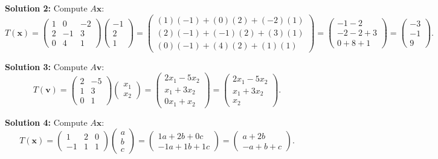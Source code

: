 \documentclass{article}
\begin{document}
\textbf{Solution 2:}
Compute $A\mathbf{x}$:
$$T(\mathbf{x}) = \begin{pmatrix} 1 & 0 & -2 \\ 2 & -1 & 3 \\ 0 & 4 & 1 \end{pmatrix} \begin{pmatrix} -1 \\ 2 \\ 1 \end{pmatrix} = \begin{pmatrix} (1)(-1) + (0)(2) + (-2)(1) \\ (2)(-1) + (-1)(2) + (3)(1) \\ (0)(-1) + (4)(2) + (1)(1) \end{pmatrix} = \begin{pmatrix} -1 - 2 \\ -2 - 2 + 3 \\ 0 + 8 + 1 \end{pmatrix} = \begin{pmatrix} -3 \\ -1 \\ 9 \end{pmatrix}.$$

\textbf{Solution 3:}
Compute $A\mathbf{v}$:
$$T(\mathbf{v}) = \begin{pmatrix} 2 & -5 \\ 1 & 3 \\ 0 & 1 \end{pmatrix} \begin{pmatrix} x_1 \\ x_2 \end{pmatrix} = \begin{pmatrix} 2x_1 - 5x_2 \\ x_1 + 3x_2 \\ 0x_1 + x_2 \end{pmatrix} = \begin{pmatrix} 2x_1 - 5x_2 \\ x_1 + 3x_2 \\ x_2 \end{pmatrix}.$$

\textbf{Solution 4:}
Compute $A\mathbf{x}$:
$$T(\mathbf{x}) = \begin{pmatrix} 1 & 2 & 0 \\ -1 & 1 & 1 \end{pmatrix} \begin{pmatrix} a \\ b \\ c \end{pmatrix} = \begin{pmatrix} 1a + 2b + 0c \\ -1a + 1b + 1c \end{pmatrix} = \begin{pmatrix} a + 2b \\ -a + b + c \end{pmatrix}.$$
\end{document}

